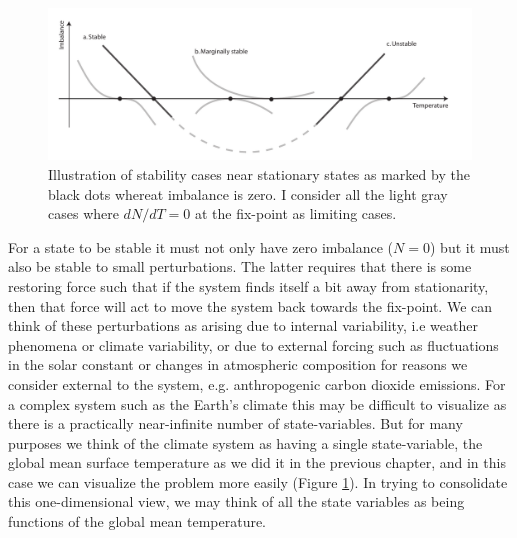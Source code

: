 \documentclass[12pt]{book}
\begin{document}
\begin{figure}
\begin{center}
\includegraphics[width=17 cm]{../illustrations/Feedback_stability_cases.pdf}
\end{center}
\caption{ Illustration of stability cases near stationary states as marked by the black dots whereat imbalance is zero. I consider all the light gray cases where $d N/ d T = 0$ at the fix-point as limiting cases. } 
\label{fig:feedback_stability_cases}
\end{figure}

For a state to be stable it must not only have zero imbalance ($N=0$) but it must also be stable to small perturbations. The latter requires that there is some restoring force such that if the system finds itself a bit away from stationarity, then that force will act to move the system back towards the fix-point. We can think of these perturbations as arising due to internal variability, i.e weather phenomena or climate variability, or due to external forcing such as fluctuations in the solar constant or changes in atmospheric composition for reasons we consider external to the system, e.g. anthropogenic carbon dioxide emissions. For a complex system such as the Earth's climate this may be difficult to visualize as there is a practically near-infinite number of state-variables. But for many purposes we think of the climate system as having a single state-variable, the global mean surface temperature as we did it in the previous chapter, and in this case we can visualize the problem more easily (Figure \ref{fig:feedback_stability_cases}). In trying to consolidate this one-dimensional view, we may think of all the state variables as being functions of the global mean temperature. 
\end{document}
